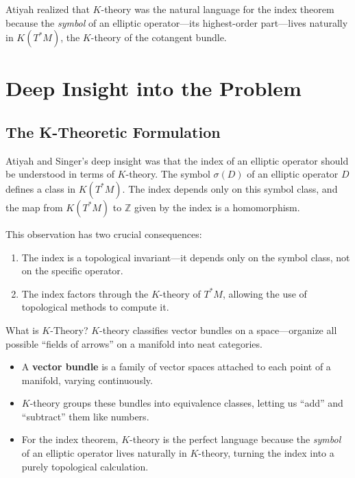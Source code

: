 Atiyah realized that $K$-theory was the natural language for the index theorem because the \emph{symbol} of an elliptic operator---its highest-order part---lives naturally in $K(T^*M)$, the $K$-theory of the cotangent bundle.

\section{Deep Insight into the Problem}

\subsection{The K-Theoretic Formulation}

Atiyah and Singer's deep insight was that the index of an elliptic operator should be understood in terms of $K$-theory. The symbol $\sigma(D)$ of an elliptic operator $D$ defines a class in $K(T^*M)$. The index depends only on this symbol class, and the map from $K(T^*M)$ to $\mathbb{Z}$ given by the index is a homomorphism.

This observation has two crucial consequences:
\begin{enumerate}
\item The index is a topological invariant---it depends only on the symbol class, not on the specific operator.
\item The index factors through the $K$-theory of $T^*M$, allowing the use of topological methods to compute it.
\end{enumerate}

\begin{knowledgebridge}{What is $K$-Theory?}
$K$-theory classifies vector bundles on a space---organize all possible ``fields of arrows'' on a manifold into neat categories.
\begin{itemize}
    \item A \textbf{vector bundle} is a family of vector spaces attached to each point of a manifold, varying continuously.
    \item $K$-theory groups these bundles into equivalence classes, letting us ``add'' and ``subtract'' them like numbers.
    \item For the index theorem, $K$-theory is the perfect language because the \emph{symbol} of an elliptic operator lives naturally in $K$-theory, turning the index into a purely topological calculation.
\end{itemize}
\end{knowledgebridge}

